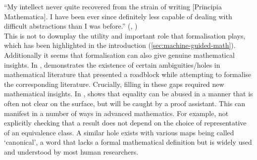 “My intellect never quite recovered from the strain of
writing [Principia Mathematica]. I have been ever since
definitely less capable of dealing with difficult
abstractions than I was before.” (\citeauthor{Russell1975-RUSA-7}, \cite{Russell1975-RUSA-7})\\
This is not to downplay the utility and important role that formalisation plays, which has been highlighted in the introduction (\ref{sec:machine-guided-math}). Additionally it seems that formalisation can also give genuine mathematical insights. In \cite{buzzardGrothendieckUseEquality2024}, \citeauthor{buzzardGrothendieckUseEquality2024} demonstrates the existence of certain ambiguities/holes in mathematical literature that presented a roadblock while attempting to formalise the corresponding literature. Crucially, filling in these gaps required new mathematical insights. In \cite{buzzardGrothendieckUseEquality2024}, \citeauthor{buzzardGrothendieckUseEquality2024} shows that equality can be abused in a manner that is often not clear on the surface, but will be caught by a proof assistant. This can manifest in a number of ways in advanced mathematics. For example, not explicitly checking that a result does not depend on the choice of representative of an equivalence class.
A similar hole exists with various maps being called `canonical', a word that lacks a formal mathematical definition but is widely used and understood by most human researchers.

